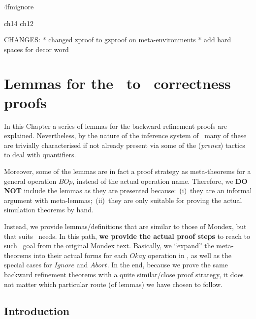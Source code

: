 \ai4fmignore{
\begin{zsection}
  \SECTION ch14 \parents ch12
\end{zsection}
CHANGES:
* changed zproof to gzproof on meta-environments
* add hard spaces for decor word
}

\chapter[\Abs\ to \Betw\ lemmas]{Lemmas for the \Abs\ to \Betw\ correctness proofs}\label{ch14}

\newcommand{\pdThisPred}{\mathcal{P}}
\newcommand{\chosenLostPred}{\mathcal{Q}}


In this Chapter a series of lemmas for the backward refinement proofs are
explained. Nevertheless, by the nature of the inference system of \zeves\
many of these are trivially characterised if not already present via some of
the (\textit{prenex}) tactics to deal with quantifiers.

Moreover, some of the lemmas are in fact a proof strategy as
meta-theorems for a general operation $BOp$, instead of the actual
operation name. Therefore, we \textbf{DO NOT} include the lemmas as
they are presented because:~(i)~they are an informal argument with
meta-lemmas;~(ii)~they are only suitable for proving the actual
simulation theorems by hand.

Instead, we provide lemmas/definitions that are similar to those of
Mondex, but that suits \zeves\ needs. In this path, \textbf{we provide the actual
proof steps} to reach to such \zeves\ goal from the original Mondex text.
Basically, we ``expand'' the meta-theorems into their actual forms for each $Okay$
operation in \Betw, as well as the special cases for $Ignore$ and $Abort$. In the
end, because we prove the same backward refinement theorems with a
quite similar/close proof strategy, it does not matter which
particular route (of lemmas) we have chosen to follow.

\section{Introduction}

